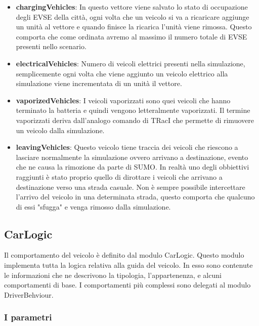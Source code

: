 \begin{itemize}
	\item \textbf{chargingVehicles}: In questo vettore viene salvato lo stato di occupazione degli EVSE della città, ogni volta che un veicolo si va a ricaricare aggiunge un unità al vettore e quando finisce la ricarica l'unità viene rimossa. Questo comporta che come ordinata avremo al massimo il numero totale di EVSE presenti nello scenario.
	\item \textbf{electricalVehicles}: Numero di veicoli elettrici presenti nella simulazione, semplicemente ogni volta che viene aggiunto un veicolo elettrico alla simulazione viene incrementata di un unità il vettore.
	\item \textbf{vaporizedVehicles}: I veicoli vaporizzati sono quei veicoli che hanno terminato la batteria e quindi vengono letteralmente vaporizzati. Il termine vaporizzati deriva dall'analogo comando di TRacI che permette di rimuovere un veicolo dalla simulazione. 
	\item \textbf{leavingVehicles}: Questo veicolo tiene traccia dei veicoli che riescono a lasciare normalmente la simulazione ovvero arrivano a destinazione, evento che ne causa la rimozione da parte di SUMO. In realtà uno degli obbiettivi raggiunti è stato proprio quello di dirottare i veicoli che arrivano a destinazione verso una strada casuale. Non è sempre possibile intercettare l'arrivo del veicolo in una determinata strada, questo comporta che qualcuno di essi "sfugga" e venga rimosso dalla simulazione.
\end{itemize}


\subsection{CarLogic}

Il comportamento del veicolo è definito dal modulo CarLogic. Questo modulo implementa tutta la logica relativa alla guida del veicolo. In esso sono contenute le informazioni che ne descrivono la tipologia, l'appartenenza, e alcuni comportamenti di base. I comportamenti più complessi sono delegati al modulo DriverBehviour.

\subsubsection{I parametri}

